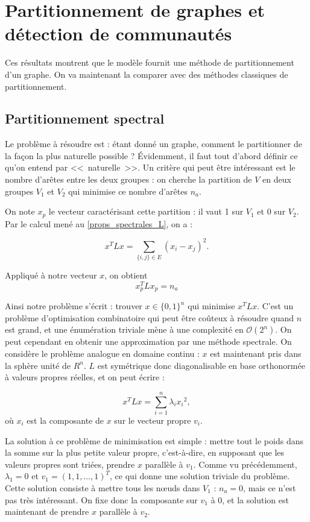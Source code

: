 \documentclass[12pt]{article}
\begin{document}
\section{Partitionnement de graphes et détection de communautés}
Ces résultats montrent que le modèle fournit une méthode de
partitionnement d'un graphe. On va maintenant la comparer avec des
méthodes classiques de partitionnement.

\subsection{Partitionnement spectral}
Le problème à résoudre est : étant donné un graphe, comment le
partitionner de la façon la plus naturelle possible ? Évidemment, il
faut tout d'abord définir ce qu'on entend par <<~naturelle~>>. Un
critère qui peut être intéressant est le nombre d'arêtes entre les
deux groupes : on cherche la partition de $V$ en deux groupes $V_1$ et
$V_2$ qui minimise ce nombre d'arêtes $n_a$.

On note $x_p$ le vecteur caractérisant cette partition : il vaut 1 sur
$V_1$ et 0 sur $V_2$. Par le calcul mené au \ref{props_spectrales_L},
on a :

\begin{equation}
 x^T L x = \sum_{\{i, j\} \in E} (x_i - x_j)^2.
\end{equation}

Appliqué à notre vecteur $x$, on obtient
\begin{equation}
 x_p^T L x_p = n_a
\end{equation}

Ainsi notre problème s'écrit : trouver $x \in \{0,1\}^n$ qui
minimise $x^T L x$. C'est un problème d'optimisation combinatoire
qui peut être coûteux à résoudre quand $n$ est grand, et une
énumération triviale mène à une complexité en $\mathcal O (2^n)$. On peut
cependant en obtenir une approximation par une méthode spectrale. On
considère le problème analogue en domaine continu : $x$ est
maintenant pris dans la sphère unité de $R^n$. $L$ est symétrique donc
diagonalisable en base orthonormée à valeurs propres réelles, et on
peut écrire :

\begin{equation}
 x^T L x = \sum_{i=1}^n \lambda_i {x_i}^2,
\end{equation}
où $x_i$ est la composante de $x$ sur le vecteur propre $v_i$.

La solution à ce problème de minimisation est simple : mettre tout le
poids dans la somme sur la plus petite valeur propre, c'est-à-dire, en
supposant que les valeurs propres sont triées, prendre $x$ parallèle à
$v_1$. Comme vu précédemment, $\lambda_1 = 0$ et $v_1 = (1, 1, \dots,
1)^T$, ce qui donne une solution triviale du problème. Cette solution
consiste à mettre tous les n\oe uds dans $V_1$ : $n_a = 0$, mais ce
n'est pas très intéressant. On fixe donc la composante sur $v_1$ à 0,
et la solution est maintenant de prendre $x$ parallèle à $v_2$.
\end{document}
